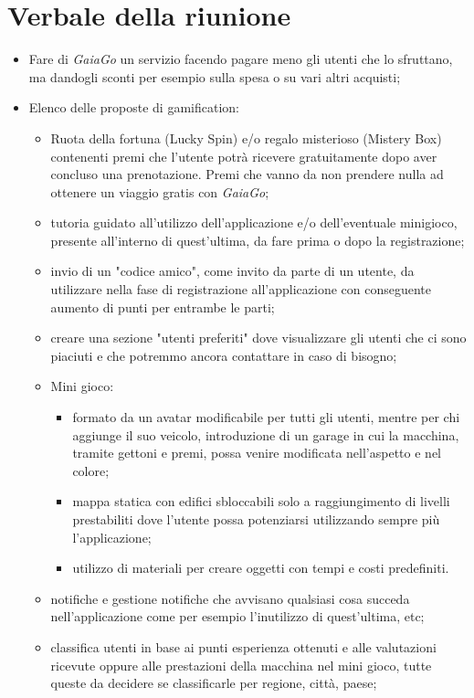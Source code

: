 \section{Verbale della riunione}
\begin{itemize}
	\item Fare di \textit{GaiaGo} un servizio facendo pagare meno gli utenti che lo sfruttano, ma dandogli sconti per esempio sulla spesa o su vari altri acquisti;
	\item Elenco delle proposte di gamification\glo:
		\begin{itemize}
			\item Ruota della fortuna (Lucky Spin) e/o regalo misterioso (Mistery Box) contenenti premi che l'utente potrà ricevere gratuitamente dopo aver concluso una prenotazione. Premi che vanno da non prendere nulla ad ottenere un viaggio gratis con \textit{GaiaGo};
			\item tutoria guidato all'utilizzo dell'applicazione e/o dell'eventuale minigioco, presente all'interno di quest'ultima, da fare prima o dopo la registrazione;
			\item invio di un "codice amico", come invito da parte di un utente, da utilizzare nella fase di registrazione all'applicazione con conseguente aumento di punti per entrambe le parti;
			\item creare una sezione "utenti preferiti" dove visualizzare gli utenti che ci sono piaciuti e che potremmo ancora contattare in caso di bisogno; 
			\item Mini gioco: 
				\begin{itemize}
					\item formato da un avatar modificabile per tutti gli utenti, mentre per chi aggiunge il suo veicolo, introduzione di un garage in cui la macchina, tramite gettoni e premi, possa venire modificata nell'aspetto e nel colore;
					\item mappa statica con edifici sbloccabili solo a raggiungimento di livelli prestabiliti dove l'utente possa potenziarsi utilizzando sempre più l'applicazione;
					\item utilizzo di materiali per creare oggetti con tempi e costi predefiniti. 
				\end{itemize}
			\item notifiche e gestione notifiche che avvisano qualsiasi cosa succeda nell'applicazione come per esempio l'inutilizzo di quest'ultima, etc;
			\item classifica utenti in base ai punti esperienza ottenuti e alle valutazioni ricevute oppure alle prestazioni della macchina nel mini gioco, tutte queste da decidere se classificarle per regione, città, paese;

\end{itemize}
\end{itemize}

